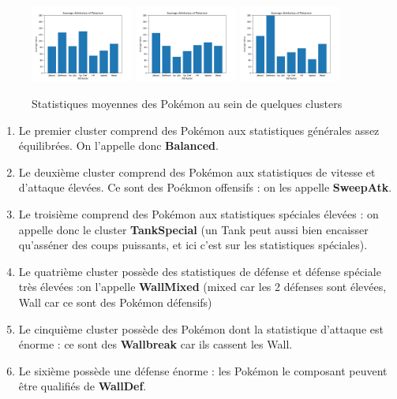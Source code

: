 \documentclass[a4paper,12pt]{article}
\begin{document}
\begin{figure}[!h]
    \includegraphics[width=0.3\textwidth]{Clustering/stats_cluster/9_WallMixed.png}
    \includegraphics[width=0.3\textwidth]{Clustering/stats_cluster/14_WallbreakAtk.png}
    \includegraphics[width=0.3\textwidth]{Clustering/stats_cluster/16_UltraWallDef.png}

    \caption{Statistiques moyennes des Pokémon au sein de quelques clusters}
\end{figure}


\begin{enumerate}
    \item Le premier cluster comprend des Pokémon aux statistiques générales assez équilibrées. On l'appelle donc \textbf{Balanced}.
    \item Le deuxième cluster comprend des Pokémon aux statistiques de vitesse et d'attaque élevées. Ce sont des Poékmon offensifs : on les appelle \textbf{SweepAtk}.
    \item Le troisième comprend des Pokémon aux statistiques spéciales élevées : on appelle donc le cluster \textbf{TankSpecial} (un Tank peut aussi bien encaisser qu'asséner des coups puissants, et ici c'est sur les statistiques spéciales).
    \item Le quatrième cluster possède des statistiques de défense et défense spéciale très élevées :on l'appelle \textbf{WallMixed} (mixed car les 2 défenses sont élevées, Wall car ce sont des Pokémon défensifs)
    \item Le cinquième cluster possède des Pokémon dont la statistique d'attaque est énorme : ce sont des \textbf{Wallbreak} car ils cassent les Wall.
    \item Le sixième possède une défense énorme : les Pokémon le composant peuvent être qualifiés de \textbf{WallDef}.
\end{enumerate}
\end{document}
